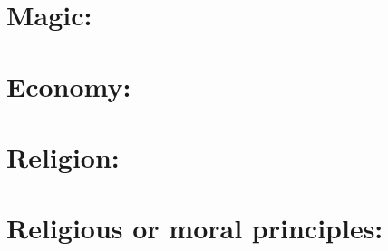 \documentclass[blue]{GL2020}
\begin{document}
\section{Magic:}
 
\section{Economy:}

\section{Religion:}

\section{Religious or moral principles:}
\end{document}
